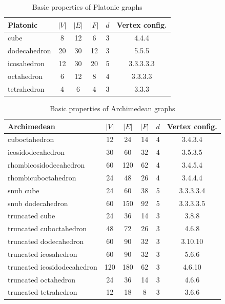 \begin{table}[H]
\centering
\begin{tabular}{l@{\hspace{1.5cm}}ccccc}
\toprule
\textbf{Platonic} & \textbf{$|V|$} & \textbf{$|E|$} & \textbf{$|F|$} & \textbf{$d$} & \textbf{Vertex config.} \\
\midrule
cube & 8 & 12 & 6 & 3 & 4.4.4 \\
dodecahedron & 20 & 30 & 12 & 3 & 5.5.5 \\
icosahedron & 12 & 30 & 20 & 5 & 3.3.3.3.3 \\
octahedron & 6 & 12 & 8 & 4 & 3.3.3.3 \\
tetrahedron & 4 & 6 & 4 & 3 & 3.3.3 \\
\bottomrule
\end{tabular}
\caption{Basic properties of Platonic graphs}
\label{tab:platonic-basic-props}
\end{table}

\begin{table}[H]
\centering
\begin{tabular}{l@{\hspace{1.5cm}}ccccc}
\toprule
\textbf{Archimedean} & \textbf{$|V|$} & \textbf{$|E|$} & \textbf{$|F|$} & \textbf{$d$} & \textbf{Vertex config.} \\
\midrule
cuboctahedron & 12 & 24 & 14 & 4 & 3.4.3.4 \\
icosidodecahedron & 30 & 60 & 32 & 4 & 3.5.3.5 \\
rhombicosidodecahedron & 60 & 120 & 62 & 4 & 3.4.5.4 \\
rhombicuboctahedron & 24 & 48 & 26 & 4 & 3.4.4.4 \\
snub cube & 24 & 60 & 38 & 5 & 3.3.3.3.4 \\
snub dodecahedron & 60 & 150 & 92 & 5 & 3.3.3.3.5 \\
truncated cube & 24 & 36 & 14 & 3 & 3.8.8 \\
truncated cuboctahedron & 48 & 72 & 26 & 3 & 4.6.8 \\
truncated dodecahedron & 60 & 90 & 32 & 3 & 3.10.10 \\
truncated icosahedron & 60 & 90 & 32 & 3 & 5.6.6 \\
truncated icosidodecahedron & 120 & 180 & 62 & 3 & 4.6.10 \\
truncated octahedron & 24 & 36 & 14 & 3 & 4.6.6 \\
truncated tetrahedron & 12 & 18 & 8 & 3 & 3.6.6 \\
\bottomrule
\end{tabular}
\caption{Basic properties of Archimedean graphs}
\label{tab:archimedean-basic-props}
\end{table}